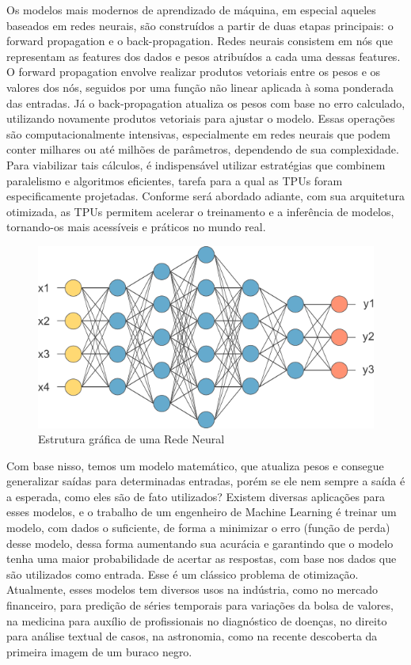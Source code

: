 \documentclass{report}
\begin{document}
Os modelos mais modernos de aprendizado de máquina, em especial aqueles baseados em redes neurais, são construídos a partir de duas etapas principais: o forward propagation e o back-propagation. Redes neurais consistem em nós que representam as features dos dados e pesos atribuídos a cada uma dessas features. O forward propagation envolve realizar produtos vetoriais entre os pesos e os valores dos nós, seguidos por uma função não linear aplicada à soma ponderada das entradas. Já o back-propagation atualiza os pesos com base no erro calculado, utilizando novamente produtos vetoriais para ajustar o modelo.
Essas operações são computacionalmente intensivas, especialmente em redes neurais que podem conter milhares ou até milhões de parâmetros, dependendo de sua complexidade. Para viabilizar tais cálculos, é indispensável utilizar estratégias que combinem paralelismo e algoritmos eficientes, tarefa para a qual as TPUs foram especificamente projetadas. Conforme será abordado adiante, com sua arquitetura otimizada, as TPUs permitem acelerar o treinamento e a inferência de modelos, tornando-os mais acessíveis e práticos no mundo real.

\begin{figure}[h]
	\includegraphics[scale=0.7]{neuralNetwork}
	\centering
	\caption{Estrutura gráfica de uma Rede Neural}
\end{figure}

\setlength{\parskip}{1em}\hspace{0.5cm} Com base nisso, temos um modelo matemático, que atualiza pesos e consegue generalizar saídas para determinadas entradas, porém se ele nem sempre a saída é a esperada, como eles são de fato utilizados? Existem diversas aplicações para esses modelos, e o trabalho de um engenheiro de Machine Learning é treinar um modelo, com dados o suficiente, de forma a minimizar o erro (função de perda) desse modelo, dessa forma aumentando sua acurácia e garantindo que o modelo tenha uma maior probabilidade de acertar as respostas, com base nos dados que são utilizados como entrada. Esse é um clássico problema de otimização. Atualmente, esses modelos tem diversos usos na indústria, como no mercado financeiro, para predição de séries temporais para variações da bolsa de valores, na medicina para auxílio de profissionais no diagnóstico de doenças, no direito para análise textual de casos, na astronomia, como na recente descoberta da primeira imagem de um buraco negro. 
\end{document}
